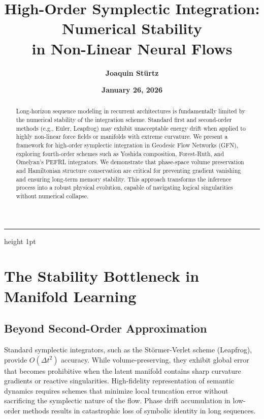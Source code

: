 \documentclass[12pt,a4paper]{article}
\title{\textbf{High-Order Symplectic Integration: Numerical Stability\\ in Non-Linear Neural Flows}}
\author{\textbf{Joaquin Stürtz}}
\date{\textbf{January 26, 2026}}
\begin{document}
\maketitle
\vspace{-0.5cm}
\begin{center}
\hrule height 1pt
\end{center}
\vspace{0.5cm}

\begin{abstract}
Long-horizon sequence modeling in recurrent architectures is fundamentally limited by the numerical stability of the integration scheme. Standard first and second-order methods (e.g., Euler, Leapfrog) may exhibit unacceptable energy drift when applied to highly non-linear force fields or manifolds with extreme curvature. We present a framework for high-order symplectic integration in Geodesic Flow Networks (GFN), exploring fourth-order schemes such as Yoshida composition, Forest-Ruth, and Omelyan's PEFRL integrators. We demonstrate that phase-space volume preservation and Hamiltonian structure conservation are critical for preventing gradient vanishing and ensuring long-term memory stability. This approach transforms the inference process into a robust physical evolution, capable of navigating logical singularities without numerical collapse.
\end{abstract}

\vspace{1cm}

\section{The Stability Bottleneck in Manifold Learning}

\subsection{Beyond Second-Order Approximation}

Standard symplectic integrators, such as the Störmer-Verlet scheme (Leapfrog), provide $O(\Delta t^2)$ accuracy. While volume-preserving, they exhibit global error that becomes prohibitive when the latent manifold contains sharp curvature gradients or reactive singularities. High-fidelity representation of semantic dynamics requires schemes that minimize local truncation error without sacrificing the symplectic nature of the flow. Phase drift accumulation in low-order methods results in catastrophic loss of symbolic identity in long sequences.
\end{document}
